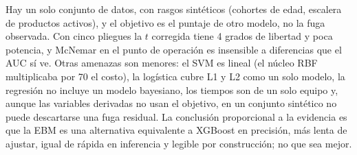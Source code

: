 Hay un solo conjunto de datos, con rasgos sintéticos (cohortes de edad, escalera de productos activos), y el
objetivo es el puntaje de otro modelo, no la fuga observada. Con cinco pliegues la $t$ corregida tiene 4 grados de libertad y poca potencia, y McNemar en el punto
de operación es insensible a diferencias que el AUC sí ve. Otras amenazas son menores: el SVM es lineal (el núcleo RBF multiplicaba por
70 el costo), la logística cubre L1 y L2 como un solo modelo, la regresión no incluye un modelo bayesiano, los
tiempos son de un solo equipo y, aunque las variables derivadas no usan el objetivo, en un conjunto sintético
no puede descartarse una fuga residual. La conclusión proporcional a la evidencia es que la EBM es una
alternativa equivalente a XGBoost en precisión, más lenta de ajustar, igual de rápida en inferencia y legible
por construcción; no que sea mejor.
